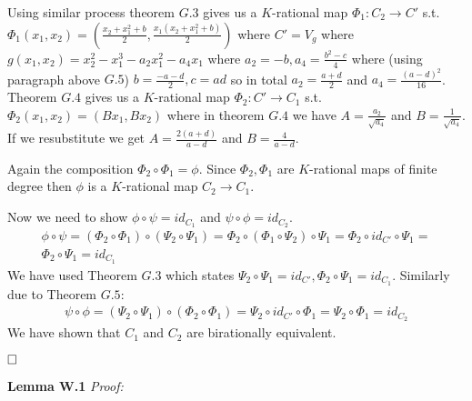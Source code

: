 \documentclass[12pt, a4paper]{article}
\newcommand{\qed}{\hfill\square}
\begin{document}
Using similar process theorem $G.3$ gives us a $K$-rational map $\Phi_1: C_2 \rightarrow C'$ s.t. $\Phi_1(x_1, x_2) = \left(\frac{x_2+x_1^2+b}{2}, \frac{x_1(x_2+x_1^2+b)}{2} \right)$ where $C' = V_g$ where $g(x_1,x_2) = x_2^2-x_1^3-a_2x_1^2-a_4x_1$ where $a_2 = -b, a_4 = \frac{b^2-c}{4}$ where (using paragraph above $G.5$) $b = \frac{-a-d}{2}, c = ad$ so in total $a_2 = \frac{a+d}{2}$ and $a_4 = \frac{(a-d)^2}{16}$. Theorem $G.4$ gives us a $K$-rational map $\Phi_2: C' \rightarrow C_1$ s.t. $\Phi_2(x_1, x_2) = (Bx_1, Bx_2)$ where in theorem $G.4$ we have $A = \frac{a_2}{\sqrt{a_4}}$ and $B = \frac{1}{\sqrt{a_4}}$. If we resubstitute we get $A = \frac{2(a+d)}{a-d}$ and $B = \frac{4}{a-d}$.

Again the composition $\Phi_2 \circ \Phi_1 = \phi$. Since $\Phi_2, \Phi_1$ are $K$-rational maps of finite degree then $\phi$ is a $K$-rational map $C_2 \rightarrow C_1$.

Now we need to show $\phi \circ \psi = id_{C_1}$ and $\psi \circ \phi = id_{C_2}$.
\begin{gather*}
\phi \circ \psi = (\Phi_2 \circ \Phi_1) \circ (\Psi_2 \circ \Psi_1) = \Phi_2 \circ (\Phi_1 \circ \Psi_2) \circ \Psi_1 = \Phi_2 \circ id_{C'} \circ \Psi_1 =\\
\Phi_2 \circ \Psi_1 = id_{C_1}
\end{gather*}
We have used Theorem $G.3$ which states $\Psi_2 \circ \Psi_1 = id_{C'}, \Phi_2 \circ \Psi_1 = id_{C_1}$. Similarly due to Theorem $G.5$:
\begin{gather*}
\psi \circ \phi = (\Psi_2 \circ \Psi_1) \circ (\Phi_2 \circ \Phi_1) = \Psi_2 \circ id_{C'} \circ \Phi_1 = \Psi_2 \circ \Phi_1 = id_{C_2}
\end{gather*}
We have shown that $C_1$ and $C_2$ are birationally equivalent.

$\qed$

\textbf{Lemma W.1} \textit{Proof:}
\end{document}
